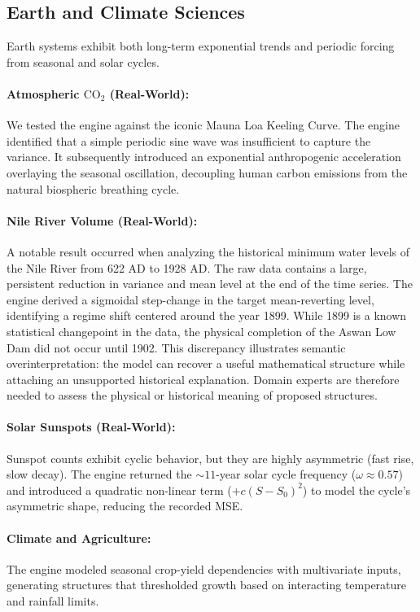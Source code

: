\subsection{Earth and Climate Sciences}

Earth systems exhibit both long-term exponential trends and periodic forcing from seasonal and solar cycles.

\paragraph{Atmospheric $\text{CO}_2$ (Real-World):} We tested the engine against the iconic Mauna Loa Keeling Curve. The engine identified that a simple periodic sine wave was insufficient to capture the variance. It subsequently introduced an exponential anthropogenic acceleration overlaying the seasonal oscillation, decoupling human carbon emissions from the natural biospheric breathing cycle.
\paragraph{Nile River Volume (Real-World):} A notable result occurred when analyzing the historical minimum water levels of the Nile River from 622 AD to 1928 AD. The raw data contains a large, persistent reduction in variance and mean level at the end of the time series. The engine derived a sigmoidal step-change in the target mean-reverting level, identifying a regime shift centered around the year 1899. While 1899 is a known statistical changepoint in the data, the physical completion of the Aswan Low Dam did not occur until 1902. This discrepancy illustrates semantic overinterpretation: the model can recover a useful mathematical structure while attaching an unsupported historical explanation. Domain experts are therefore needed to assess the physical or historical meaning of proposed structures.
\paragraph{Solar Sunspots (Real-World):} Sunspot counts exhibit cyclic behavior, but they are highly asymmetric (fast rise, slow decay). The engine returned the $\sim 11$-year solar cycle frequency ($\omega \approx 0.57$) and introduced a quadratic non-linear term ($+c(S-S_0)^2$) to model the cycle's asymmetric shape, reducing the recorded MSE.
\paragraph{Climate and Agriculture:} The engine modeled seasonal crop-yield dependencies with multivariate inputs, generating structures that thresholded growth based on interacting temperature and rainfall limits.

